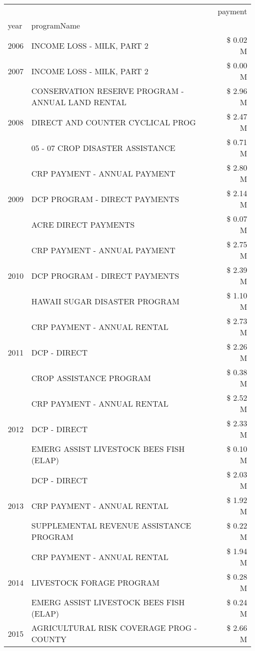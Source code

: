 \begin{tabular}{llr}
\toprule
 &  & payment \\
year & programName &  \\
\midrule
2006 & INCOME LOSS - MILK, PART 2 & \$ 0.02 M \\
\cline{1-3}
2007 & INCOME LOSS - MILK, PART 2 & \$ 0.00 M \\
\cline{1-3}
\multirow[t]{3}{*}{2008} & CONSERVATION RESERVE PROGRAM - ANNUAL LAND RENTAL & \$ 2.96 M \\
 & DIRECT AND COUNTER CYCLICAL PROG & \$ 2.47 M \\
 & 05 - 07 CROP DISASTER ASSISTANCE & \$ 0.71 M \\
\cline{1-3}
\multirow[t]{3}{*}{2009} & CRP PAYMENT - ANNUAL PAYMENT & \$ 2.80 M \\
 & DCP PROGRAM - DIRECT PAYMENTS & \$ 2.14 M \\
 & ACRE DIRECT PAYMENTS & \$ 0.07 M \\
\cline{1-3}
\multirow[t]{3}{*}{2010} & CRP PAYMENT - ANNUAL PAYMENT & \$ 2.75 M \\
 & DCP PROGRAM - DIRECT PAYMENTS & \$ 2.39 M \\
 & HAWAII SUGAR DISASTER PROGRAM & \$ 1.10 M \\
\cline{1-3}
\multirow[t]{3}{*}{2011} & CRP PAYMENT - ANNUAL RENTAL & \$ 2.73 M \\
 & DCP - DIRECT & \$ 2.26 M \\
 & CROP ASSISTANCE PROGRAM & \$ 0.38 M \\
\cline{1-3}
\multirow[t]{3}{*}{2012} & CRP PAYMENT - ANNUAL RENTAL & \$ 2.52 M \\
 & DCP - DIRECT & \$ 2.33 M \\
 & EMERG ASSIST LIVESTOCK BEES FISH (ELAP) & \$ 0.10 M \\
\cline{1-3}
\multirow[t]{3}{*}{2013} & DCP - DIRECT & \$ 2.03 M \\
 & CRP PAYMENT - ANNUAL RENTAL & \$ 1.92 M \\
 & SUPPLEMENTAL REVENUE ASSISTANCE PROGRAM & \$ 0.22 M \\
\cline{1-3}
\multirow[t]{3}{*}{2014} & CRP PAYMENT - ANNUAL RENTAL & \$ 1.94 M \\
 & LIVESTOCK FORAGE PROGRAM & \$ 0.28 M \\
 & EMERG ASSIST LIVESTOCK BEES FISH (ELAP) & \$ 0.24 M \\
\cline{1-3}
\multirow[t]{3}{*}{2015} & AGRICULTURAL RISK COVERAGE PROG - COUNTY & \$ 2.66 M \\

\end{tabular}
